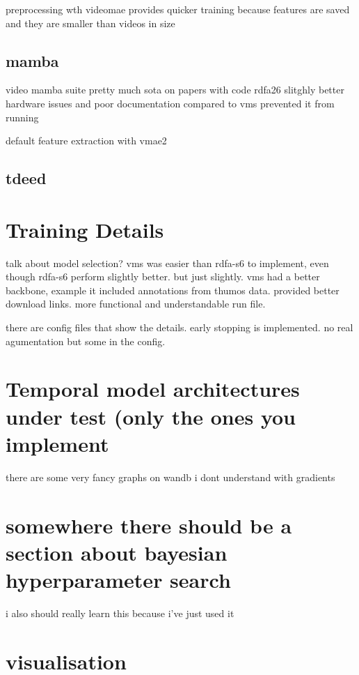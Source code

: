 preprocessing wth videomae provides quicker training because features are saved and they are smaller than videos in size

\subsection{mamba}
\label{ssec:mamba}

video mamba suite pretty much sota on papers with code
rdfa26 slitghly better
hardware issues and poor documentation compared to vms prevented it from running


default feature extraction with vmae2

\subsection{\acrfull{tdeed}}

\section{Training Details}

talk about model selection? vms was easier than rdfa-s6 to implement, even though rdfa-s6 perform slightly better. but just slightly. vms had a better backbone, example it included annotations from thumos data. provided better download links. more functional and understandable run file. 

there are config files that show the details. early stopping is implemented. no real agumentation but some in the config.

\section{Temporal model architectures under test (only the ones you implement}

there are some very fancy graphs on wandb i dont understand with gradients

\section{somewhere there should be a section about bayesian hyperparameter search}
i also should really learn this because i've just used it

\section{visualisation}

